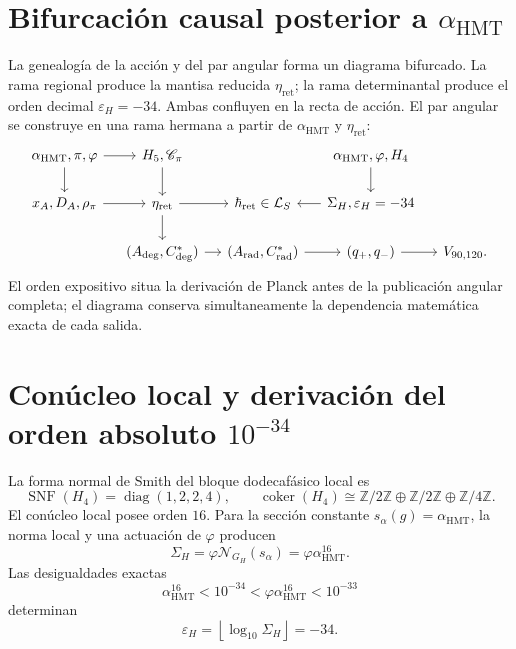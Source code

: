 \section{Bifurcación causal posterior a \texorpdfstring{\(\alpha_{\mathrm{HMT}}\)}{alpha HMT}}
\label{sec:l9s102:bifurcacion-accion-angular}

La genealogía de la acción y del par angular forma un diagrama bifurcado.
La rama regional produce la mantisa reducida \(\eta_{\mathrm{ret}}\); la rama
determinantal produce el orden decimal \(\varepsilon_H=-34\). Ambas
confluyen en la recta de acción. El par angular se construye en una rama
hermana a partir de \(\alpha_{\mathrm{HMT}}\) y
\(\eta_{\mathrm{ret}}\):
\begin{equation}
\begin{tikzcd}[column sep=small,row sep=normal]
\alpha_{\mathrm{HMT}},\pi,\varphi
  \arrow[r] \arrow[d]
& H_5,\mathscr C_\pi
  \arrow[d]
&& \alpha_{\mathrm{HMT}},\varphi,H_4
  \arrow[d] & {}\\
x_A,D_A,\rho_\pi
  \arrow[r]
& \eta_{\mathrm{ret}}
  \arrow[r] \arrow[d]
& \hbar_{\mathrm{ret}}\in\mathcal L_S
& \Sigma_H,\varepsilon_H=-34
  \arrow[l] & {}\\
& (A_{\deg},C^*_{\deg})
  \arrow[r]
& (A_{\mathrm{rad}},C^*_{\mathrm{rad}})
  \arrow[r]
& (q_+,q_-)
  \arrow[r]
& V_{90,120}.
\end{tikzcd}
\label{diag:l9s102:dag-accion-angular}
\end{equation}
El orden expositivo situa la derivación de Planck antes de la publicación
angular completa; el diagrama conserva simultaneamente la dependencia
matemática exacta de cada salida.

\section{Conúcleo local y derivación del orden absoluto \texorpdfstring{\(10^{-34}\)}{10^-34}}
\label{sec:l9s102:orden-accion}

La forma normal de Smith del bloque dodecafásico local es
\begin{equation}
 \operatorname{SNF}(H_4)=\operatorname{diag}(1,2,2,4),
 \qquad
 \operatorname{coker}(H_4)
 \cong\mathbb Z/2\mathbb Z\oplus\mathbb Z/2\mathbb Z
 \oplus\mathbb Z/4\mathbb Z.
 \label{eq:l9s102:snf-h4}
\end{equation}
El conúcleo local posee orden \(16\). Para la sección constante
\(s_\alpha(g)=\alpha_{\mathrm{HMT}}\), la norma local y una actuación de
\(\varphi\) producen
\begin{equation}
 \boxed{
 \Sigma_H=\varphi\mathcal N_{G_H}(s_\alpha)
 =\varphi\alpha_{\mathrm{HMT}}^{16}.}
 \label{eq:l9s102:sigma-h}
\end{equation}
Las desigualdades exactas
\begin{equation}
 \alpha_{\mathrm{HMT}}^{16}<10^{-34}
 <\varphi\alpha_{\mathrm{HMT}}^{16}<10^{-33}
 \label{eq:l9s102:orden-34}
\end{equation}
determinan
\begin{equation}
 \boxed{
 \varepsilon_H=\left\lfloor\log_{10}\Sigma_H\right\rfloor=-34.}
 \label{eq:l9s102:epsilon-h}
\end{equation}
